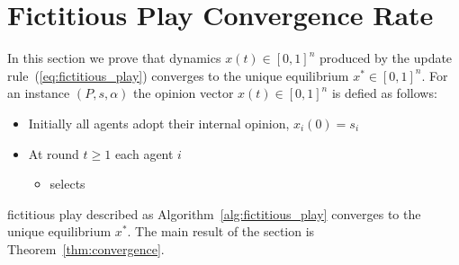 \section{Fictitious Play Convergence Rate}\label{s:fictitious_convergence}
In this section we prove that dynamics $x(t) \in [0,1]^n$ produced
by the update rule~(\ref{eq:fictitious_play}) converges to the unique equilibrium $x^* \in [0,1]^n$.
For an instance $(P,s,\alpha)$ the opinion vector $x(t) \in [0,1]^n$ is defied as follows:

\begin{itemize}
 \item Initially all agents adopt their internal opinion, $x_i(0)=s_i$
 \item At round $t \geq 1$ each agent $i$ 
 \begin{itemize}
      \item selects 
 \end{itemize}

 \end{itemize}



fictitious play described as
Algorithm~\ref{alg:fictitious_play} converges to the unique equilibrium $x^*$.
The main result of the section is Theorem~\ref{thm:convergence}.


